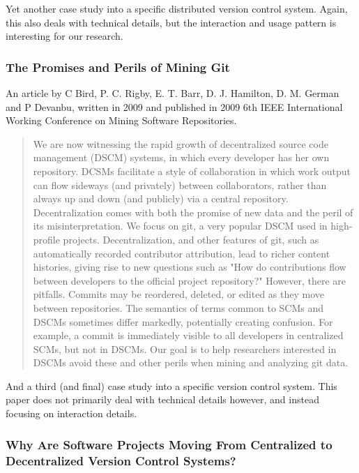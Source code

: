 \documentclass{article}
\begin{document}
Yet another case study into a specific distributed version control system.
Again, this also deals with technical details, but the interaction and usage
pattern is interesting for our research.

\subsubsection{The Promises and Perils of Mining Git}

An article by C Bird, P. C. Rigby, E. T. Barr, D. J. Hamilton, D. M. German
and P Devanbu, written in 2009 and published in 2009 6th IEEE International 
Working Conference on Mining Software Repositories\cite{bird09}.

\begin{abstract}
 We are now witnessing the rapid growth of decentralized source code
 management (DSCM) systems, in which every developer has her own repository.
 DCSMs facilitate a style of collaboration in which work output can flow
 sideways (and privately) between collaborators, rather than always up and
 down (and publicly) via a central repository. Decentralization comes with
 both the promise of new data and the peril of its misinterpretation. We
 focus on git, a very popular DSCM used in high-profile projects.
 Decentralization, and other features of git, such as automatically recorded
 contributor attribution, lead to richer content histories, giving rise to
 new questions such as "How do contributions flow between developers to the
 official project repository?" However, there are pitfalls. Commits may be
 reordered, deleted, or edited as they move between repositories. The
 semantics of terms common to SCMs and DSCMs sometimes differ markedly,
 potentially creating confusion. For example, a commit is immediately
 visible to all developers in centralized SCMs, but not in DSCMs. Our goal
 is to help researchers interested in DSCMs avoid these and other perils
 when mining and analyzing git data.
\end{abstract}

And a third (and final) case study into a specific version control system.
This paper does not primarily deal with technical details however, and
instead focusing on interaction details. 

\subsubsection{Why Are Software Projects Moving From Centralized to
               Decentralized Version Control Systems?}
\end{document}
